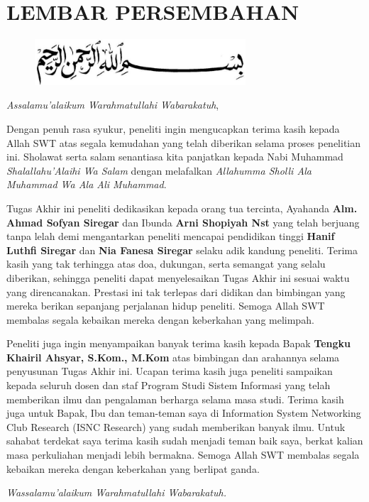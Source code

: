 %
%
%
%

\chapter*{LEMBAR PERSEMBAHAN}

\begin{figure}
	\centering
	\includegraphics[width=0.7\textwidth]{konten/gambar/bismillah.jpg}
\end{figure}

\textit{Assalamu’alaikum Warahmatullahi Wabarakatuh},

Dengan penuh rasa syukur, peneliti ingin mengucapkan terima kasih kepada Allah SWT atas segala kemudahan yang telah diberikan selama proses penelitian ini. Sholawat serta salam senantiasa kita panjatkan kepada Nabi Muhammad \textit{Shalallahu’Alaihi Wa Salam} dengan melafalkan \textit{Allahumma Sholli Ala Muhammad Wa Ala Ali Muhammad}.

Tugas Akhir ini peneliti dedikasikan kepada orang tua tercinta, Ayahanda \textbf{Alm. Ahmad Sofyan Siregar} dan Ibunda \textbf{Arni Shopiyah Nst} yang telah berjuang tanpa lelah demi mengantarkan peneliti mencapai pendidikan tinggi \textbf{Hanif Luthfi Siregar} dan \textbf{Nia Fanesa Siregar} selaku adik kandung peneliti. Terima kasih yang tak terhingga atas doa, dukungan, serta semangat yang selalu diberikan, sehingga peneliti dapat menyelesaikan Tugas Akhir ini sesuai waktu yang direncanakan. Prestasi ini tak terlepas dari didikan dan bimbingan yang mereka berikan sepanjang perjalanan hidup peneliti. Semoga Allah SWT membalas segala kebaikan mereka dengan keberkahan yang melimpah.

Peneliti juga ingin menyampaikan banyak terima kasih kepada Bapak \textbf{Tengku Khairil Ahsyar, S.Kom., M.Kom} atas bimbingan dan arahannya selama penyusunan Tugas Akhir ini. Ucapan terima kasih juga peneliti sampaikan kepada seluruh dosen dan staf Program Studi Sistem Informasi yang telah memberikan ilmu dan pengalaman berharga selama masa studi. Terima kasih juga untuk Bapak, Ibu dan teman-teman saya di Information System Networking Club Research (ISNC Research) yang sudah memberikan banyak ilmu. Untuk sahabat terdekat saya terima kasih sudah menjadi teman baik saya, berkat kalian masa perkuliahan menjadi lebih bermakna. Semoga Allah SWT membalas segala kebaikan mereka dengan keberkahan yang berlipat ganda.

\textit{Wassalamu’alaikum Warahmatullahi Wabarakatuh.}